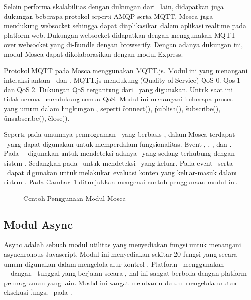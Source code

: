 Selain performa skalabilitas dengan dukungan dari \broker~lain, didapatkan juga
dukungan beberapa protokol seperti AMQP serta MQTT. Mosca juga mendukung
websocket sehingga dapat diaplikasikan dalam aplikasi realtime pada platform
web. Dukungan websocket didapatkan dengan menggunakan \f{MQTT over websocket}
yang di-\f{bundle} dengan browserify. Dengan adanya dukungan ini, modul Mosca
dapat dikolaborasikan dengan modul Express.

Protokol MQTT pada Mosca menggunakan MQTT.js. Modul ini yang menangani interaksi
antara \client~dan \broker. MQTT.js mendukung (\f{Quality of Service}) QoS 0,
Qos 1 dan QoS 2. Dukungan QoS tergantung dari \broker~yang digunakan. Untuk saat
ini tidak semua \broker~mendukung semua QoS. Modul ini menangani beberapa proses
yang umum dalam lingkungan \pubsub, seperti \f{connect}(), \f{publish}(),
\f{subscribe}(), \f{unsubscribe}(), \f{close}().

Seperti pada umumnya pemrograman \nodejs~yang berbasis \event, dalam Mosca
terdapat \event~yang dapat digunakan untuk memperdalam fungsionalitas. Event
\ready, \clientConnected, \published, \subscribed dan \clientDisconnected. Pada
\event~\clientConnected~digunakan untuk mendeteksi adanya \client~yang sedang
terhubung dengan sistem \pubsub. Sedangkan pada \clientDisconnected~untuk
mendeteksi \client~yang keluar. Pada event \published~serta \subscribed~dapat
digunakan untuk melakukan evaluasi konten yang keluar-masuk dalam sistem \pubsub.
Pada Gambar~\ref{fig:mosca} ditunjukkan mengenai contoh penggunaan modul ini.

\noindent
\begin{figure}
	\centering
	\lstset{basicstyle=\footnotesize\ttfamily,frame=single,language=javascript}
	
	\caption{Contoh Penggunaan Modul Mosca}
	\label{fig:mosca}
\end{figure}


\subsection{Modul Async}

Async adalah sebuah modul utilitas yang menyediakan fungsi untuk menangani
asynchronous Javascript. Modul ini menyediakan sekitar 20 fungsi yang secara
umum digunakan dalam mengelola alur kontrol \asynchronous. Platform
\nodejs~menggunakan \event~\driven~dengan \thread~tunggal yang berjalan secara
\asynchronous, hal ini sangat berbeda dengan platform pemrograman yang lain.
Modul ini sangat membantu dalam mengelola urutan eksekusi fungsi \anonymous~pada
\nodejs.

